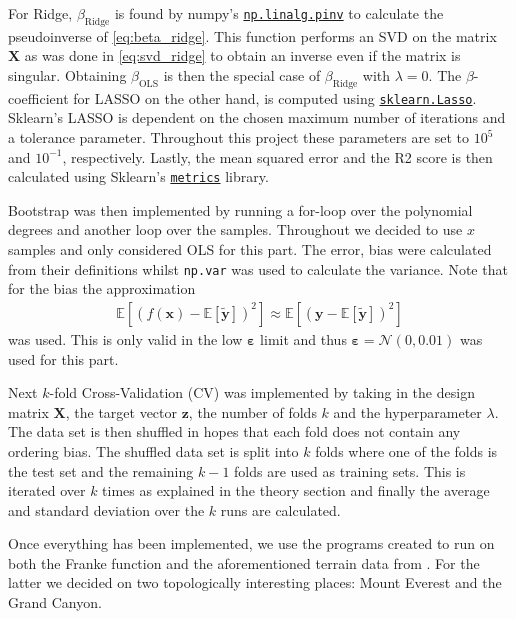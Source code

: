 \documentclass[%
reprint,
amsmath,amssymb,
aps,
pra,
]{revtex4-2}
\begin{document}
For Ridge, \(\beta_{\text{Ridge}}\) is found by numpy's \href{https://numpy.org/doc/2.0/reference/generated/numpy.linalg.pinv.html}{\texttt{np.linalg.pinv}} to calculate the pseudoinverse of \eqref{eq:beta_ridge}. This function performs an SVD on the matrix $\bm X$ as was done in \eqref{eq:svd_ridge} to obtain an inverse even if the matrix is singular. Obtaining \(\beta_{\text{OLS}}\) is then the special case of \(\beta_{\text{Ridge}}\) with \(\lambda=0\). The \(\beta\)-coefficient for LASSO on the other hand, is computed using \href{https://scikit-learn.org/stable/modules/generated/sklearn.linear_model.Lasso.html}{\texttt{sklearn.Lasso}}. 
Sklearn's LASSO is dependent on the chosen maximum number of iterations and a tolerance parameter. Throughout this project these parameters are set to \(10^5\) and \(10^{-1}\), respectively. Lastly, the mean squared error and the R2 score is then calculated using Sklearn's \href{https://scikit-learn.org/stable/modules/model_evaluation.html}{\texttt{metrics}} library.

Bootstrap was then implemented by running a for-loop over the polynomial degrees and another loop over the samples. Throughout we decided to use $x$ samples and only considered OLS for this part. The error, bias were calculated from their definitions whilst \texttt{np.var} was used to calculate the variance. Note that for the bias the approximation
\begin{align}
	\mathbb E[(f(\bm x)-\mathbb E[\tilde{\bm{y}}])^2]\approx \mathbb E[(\bm y-\mathbb E[\tilde{\bm{y}}])^2]
\end{align}
was used. This is only valid in the low $\bm \varepsilon$ limit and thus $\bm\varepsilon=\mathcal{N}(0, 0.01)$ was used for this part.

Next $k$-fold Cross-Validation (CV) was implemented by taking in the design matrix $\bm X$, the target vector $\bm z$, the number of folds $k$ and the hyperparameter $\lambda$. The data set is then shuffled in hopes that each fold does not contain any ordering bias. The shuffled data set is split into $k$ folds where one of the folds is the test set and the remaining $k-1$ folds are used as training sets. This is iterated over $k$ times as explained in the theory section and finally the average and standard deviation over the $k$ runs are calculated.

Once everything has been implemented, we use the programs created to run on both the Franke function and the aforementioned terrain data from \cite{USGS_EarthExplorer}. For the latter we decided on two topologically interesting places: Mount Everest and the Grand Canyon. 
\end{document}

